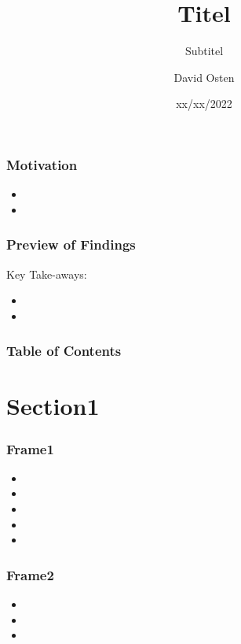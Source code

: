 \documentclass[xcolor={usenames,dvipsnames}, 
	hyperref={
	colorlinks=false, 						%
	linkcolor=black, 						%
	urlcolor=black,							%
	citecolor=black,						%
	pdfpagelabels=false,
	},
	ignorenonframetext,			%
	compress,					%
	aspectratio=169
]{beamer}
\title{Titel}
\subtitle[Optional Subtitle]{Subtitel}
\author{David Osten}
\institute{Topic/Lecture Series}
\date{xx/xx/2022}
\begin{document}
\begin{frame}  %
	\titlepage
\end{frame}
	
\addtocounter{framenumber}{-1} %







\begin{frame}
	\frametitle{Motivation}
	\begin{itemize}
		\item 
		\item 
	\end{itemize}
\end{frame}

\begin{frame}
	\frametitle{Preview of Findings}
	Key Take-aways:
	\begin{itemize}
		\item 
		\item 
	\end{itemize}
\end{frame}

\begin{frame}
	\frametitle{Table of Contents}
	\tableofcontents
\end{frame}


\section{Section1}
\begin{frame}
	\frametitle{Frame1}
	\begin{itemize}
	\item 
	\item 
	\item
	\item 
	\item 
\end{itemize}

\end{frame}


\begin{frame}
\frametitle{Frame2}

\begin{itemize}
	\item 
	\item
	\item 
\end{itemize}

\end{frame}
\end{document}
